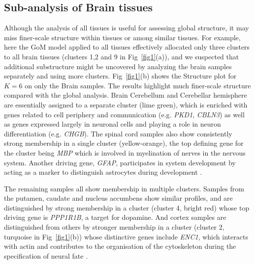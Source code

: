 \documentclass[10pt,letterpaper]{article}
\begin{document}
%

\subsection*{Sub-analysis of Brain tissues}

Although the analysis of all tissues is useful for assessing global structure, it may miss finer-scale structure within tissues or among similar tissues. For example, here the GoM model applied to all tissues effectively allocated only three clusters to all brain tissues (clusters 1,2 and 9 in Fig~\ref{fig1}(a)), and we suspected that additional substructure might be uncovered by analyzing the brain samples separately and using more clusters. Fig~\ref{fig1}(b) shows the Structure plot for $K=6$ on only the Brain samples. The results highlight much finer-scale structure compared with the global analysis. Brain Cerebellum and Cerebellar hemisphere are essentially assigned to a separate cluster (lime green), which is enriched with genes related to cell periphery and communication (e.g. \textit{PKD1}, \textit{CBLN3}) as well as genes expressed largely in neuronal cells and playing a role in neuron differentiation (e.g. \textit{CHGB}). The spinal cord samples also show consistently strong membership in a single cluster (yellow-orange), the top defining gene for the cluster being \textit{MBP} which is involved in myelination of nerves in the nervous system\cite{Hu2016}.  Another driving gene, \textit{GFAP}, participates in system development by acting as a marker to distinguish astrocytes during development \cite{Baba1997}.

The remaining samples all show membership in multiple clusters. Samples from the putamen, caudate and nucleus accumbens show similar profiles, and are distinguished by strong membership in a cluster (cluster 4, bright red) whose top driving gene is \textit{PPP1R1B}, a target for dopamine. And cortex samples are distinguished from others by stronger membership in a cluster (cluster 2, turquoise in Fig~\ref{fig1}(b)) whose distinctive genes include \textit{ENC1}, which interacts with actin and contributes to the organisation of the cytoskeleton during the specification of neural fate \cite{Hernandez1997}.
\end{document}
